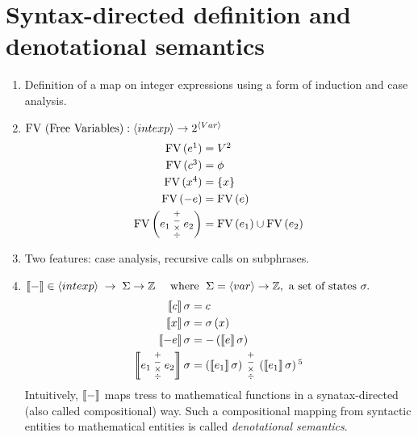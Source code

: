 \section{Syntax-directed definition and denotational semantics}
\begin{enumerate}[label=\protect\circled{\arabic*}]
  \item
    Definition of a map on integer expressions using a form of induction and
    case analysis.
  \item
    $
    \textrm{FV (Free Variables)}: \left\langle intexp \right\rangle \rightarrow 2^{\left\langle Var \right\rangle}
    $
    \begin{align*}
      \fv{e\footnotemark} &= V \footnotemark \\
      \fv{c\footnotemark} &= \phi \\
      \fv{x\footnotemark} &= \braces{x} \\
      \fv{-e} &= \fv{e} \\
      \fv{e_1 \; \substack{+\\-\\\times\\\div} \; e_2} &= \fv{e_1} \cup \fv{e_2}
    \end{align*}
    \addtocounter{footnote}{-3} 
     
     
      

  \item
    Two features: case analysis, recursive calls on subphrases.

  \item
    $
      \left\llbracket - \right\rrbracket \in \left\langle intexp \right\rangle \; \rightarrow \;
      \Sigma \rightarrow \mathbb{Z}
      \quad \textrm{ where } \; \Sigma = \left\langle var \right\rangle \rightarrow \mathbb{Z} , \textrm{ a set of states }
      \sigma.
    $
    \begin{align*}
      \bbrackets{c}\sigma &= c \\
      \bbrackets{x}\sigma &= \sigma\prths{x} \\
      \bbrackets{-e}\sigma &= -\prths{\bbrackets{e}\sigma} \\
      \bbrackets{
        e_1 \;\substack{+\\-\\\times\\\div}\; e_2
      }\sigma &= \prths{\bbrackets{e_1}\sigma}
      \;\substack{+\\-\\\times\\\div}\;
      \prths{\bbrackets{e_1}\sigma} \footnotemark
    \end{align*}
    Intuitively, $\left\llbracket - \right\rrbracket$ maps tress to mathematical functions in a
    synatax-directed (also called compositional) way. Such a compositional
    mapping from syntactic entities to mathematical entities is called
    \emph{denotational semantics}.

\end{enumerate}


